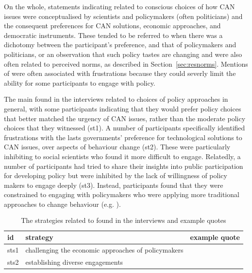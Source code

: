 On the whole, statements indicating \ismst{} related to conscious choices of how CAN issues were conceptualised by scientists and policymakers (often politicians) and the consequent preferences for CAN solutions, economic approaches, and democratic instruments. These tended to be referred to when there was a dichotomy between the participant's preference, and that of policymakers and politicians, or an observation that such policy tastes are changing and were also often related to perceived norms, as described in Section~\ref{sec:resnorms}. Mentions of \ismst{} were often associated with frustrations because they could severly limit the ability for some participants to engage with policy.

The main \ismst{} found in the interviews related to choices of policy approaches in general, with some participants indicating that they would prefer policy choices that better matched the urgency of CAN issues, rather than the moderate policy choices that they witnessed (st1). A number of participants specifically identified frustrations with the lasts governments' preference for technological solutions to CAN issues, over aspects of behaviour change (st2). These were particularly inhibiting to social scientists who found it more difficult to engage. Relatedly, a number of participants had tried to share their insights into public participation for developing policy but were inhibited by the lack of willingness of policy makers to engage deeply (st3). Instead, participants found that they were constrained to engaging with policymakers who were applying more traditional approaches to change behaviour (e.g. ).

\begin{table}[!ht]
\footnotesize
\caption{The strategies related to \ismst{} found in the interviews and example quotes}\label{tab:restastesstrat}
\begin{tabular}{L{.06\linewidth}L{.3\linewidth}L{.64\linewidth}} \hline
\textbf{id} & \textbf{strategy} & \textbf{example quote} \\ \hline \hline
sts1 & challenging the economic approaches of policymakers &  \\[5mm]
sts2 & establishing diverse engagements &  \\[5mm]
 \hline
 \end{tabular}
\end{table}

